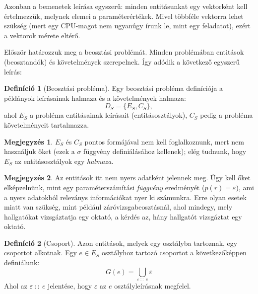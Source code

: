 \documentclass[twocolumn]{article}
\theoremstyle{definition}
\newtheorem{definition}{Definíció}[section]
\newtheorem*{megj}{Megjegyzés}
\newcommand{\set}[1]{ \{ {#1} \} }
\begin{document}
    Azonban a bemenetek leírása egyszerű: minden entitásunkat egy vektorként kell értelmezzük, melynek elemei a paraméterértékek. Mivel többféle vektorra lehet szükség (mert egy CPU-magot nem ugyanúgy írunk le, mint egy feladatot), ezért a vektorok mérete eltérő.
    
    Először határozzuk meg a beosztási problémát. Minden problémában entitások (beosztandók) és követelmények szerepelnek. Így adódik a következő egyszerű leírás:
    
    \begin{definition}[Beosztási probléma] \label{def:problema}
        Egy beosztási probléma definíciója a példányok leírásainak halmaza és a követelmények halmaza:
        \begin{equation}
            D_S = \set{E_S, C_S},
        \end{equation}
        ahol $E_S$ a probléma entitásainak leírásait (entitásosztályok), $C_S$ pedig a probléma követelményeit tartalmazza.
        \begin{megj}
            $E_S$ és $C_S$ pontos formájával nem kell foglalkoznunk, mert nem használjuk őket (ezek a $\sigma$ függvény definiálásához kellenek); elég tudnunk, hogy $E_S$ az entitásosztályok egy {\it halmaza}.
        \end{megj}
        \begin{megj} \label{megj:param_func}
            Az entitások itt nem nyers adatként jelennek meg. Úgy kell őket elképzelnünk, mint egy paraméterszámítási {\it függvény} eredményét ($p(r) = \varepsilon$), ami a nyers adatokból releványs információkat nyer ki számunkra. Erre olyan esetek miatt van szükség, mint például záróvizsgabeosztásnál, ahol mindegy, mely hallgatókat vizsgáztatja egy oktató, a kérdés az, hány hallgatót vizsgáztat egy oktató.
        \end{megj}
    \end{definition}
    
    \begin{definition}[Csoport]
        Azon entitások, melyek egy osztályba tartoznak, egy csoportot alkotnak. Egy $e \in E_S$ osztályhoz tartozó csoportot a következőképpen definiálunk:
        \begin{equation}
            G(e) = \bigcup_{\varepsilon \ :: \ e} \varepsilon
        \end{equation}
        Ahol az $\varepsilon \ :: \ e$ jelentése, hogy $\varepsilon$ az $e$ osztályleírásnak megfelel. 
    \end{definition}
    
\end{document}
